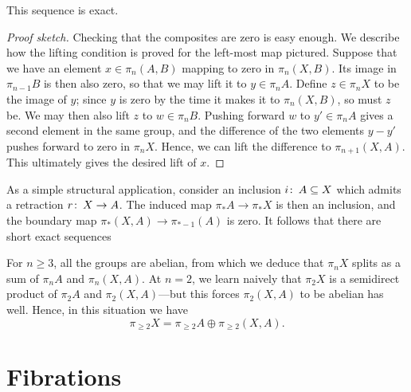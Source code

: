 \begin{lemma}
This sequence is exact.
\end{lemma}
\begin{proof}[Proof sketch]
Checking that the composites are zero is easy enough.
We describe how the lifting condition is proved for the left-most map pictured.
Suppose that we have an element $x \in \pi_n(A, B)$ mapping to zero in $\pi_n(X, B)$.
Its image in $\pi_{n-1} B$ is then also zero, so that we may lift it to $y \in \pi_n A$.
Define $z \in \pi_n X$ to be the image of $y$; since $y$ is zero by the time it makes it to $\pi_n(X, B)$, so must $z$ be.
We may then also lift $z$ to $w \in \pi_n B$.
Pushing forward $w$ to $y' \in \pi_n A$ gives a second element in the same group, and the difference of the two elements $y - y'$ pushes forward to zero in $\pi_n X$.
Hence, we can lift the difference to $\pi_{n+1}(X, A)$.
This ultimately gives the desired lift of $x$.
\end{proof}

\begin{remark}
As a simple structural application, consider an inclusion $i\colon\thinspace A \subseteq X$ which admits a retraction $r\colon\thinspace X \to A$.
The induced map $\pi_* A \to \pi_* X$ is then an inclusion, and the boundary map $\pi_*(X, A) \to \pi_{*-1}(A)$ is zero.
It follows that there are short exact sequences
\begin{center}
\end{center}
For $n \ge 3$, all the groups are abelian, from which we deduce that $\pi_n X$ splits as a sum of $\pi_n A$ and $\pi_n(X, A)$.
At $n = 2$, we learn naively that $\pi_2 X$ is a semidirect product of $\pi_2 A$ and $\pi_2(X, A)$---but this forces $\pi_2(X, A)$ to be abelian has well.
Hence, in this situation we have
\[\pi_{\ge 2} X = \pi_{\ge 2} A \oplus \pi_{\ge 2}(X, A).\]
\end{remark}




\section{Fibrations}

